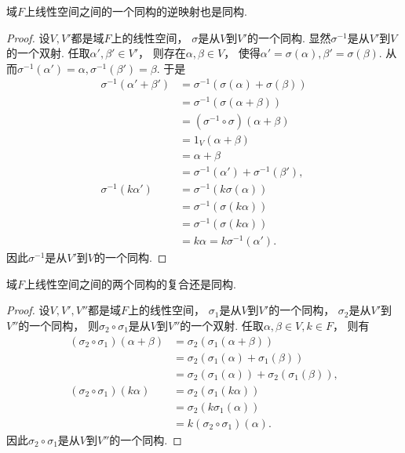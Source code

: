 \begin{proposition}
域\(F\)上线性空间之间的一个同构的逆映射也是同构.
\begin{proof}
设\(V,V'\)都是域\(F\)上的线性空间，
\(\sigma\)是从\(V\)到\(V'\)的一个同构.
显然\(\sigma^{-1}\)是从\(V'\)到\(V\)的一个双射.
任取\(\alpha',\beta' \in V'\)，
则存在\(\alpha,\beta \in V\)，
使得\(\alpha' = \sigma(\alpha),
\beta' = \sigma(\beta)\).
从而\(\sigma^{-1}(\alpha') = \alpha,
\sigma^{-1}(\beta') = \beta\).
于是\begin{align*}
	\sigma^{-1}(\alpha' + \beta')
	&= \sigma^{-1}(\sigma(\alpha) + \sigma(\beta)) \\
	&= \sigma^{-1}(\sigma(\alpha + \beta)) \\
	&= (\sigma^{-1} \circ \sigma)(\alpha + \beta) \\
	&= 1_V (\alpha + \beta) \\
	&= \alpha + \beta \\
	&= \sigma^{-1}(\alpha') + \sigma^{-1}(\beta'), \\
	\sigma^{-1}(k \alpha')
	&= \sigma^{-1}(k \sigma(\alpha)) \\
	&= \sigma^{-1}(\sigma(k \alpha)) \\
	&= \sigma^{-1}(\sigma(k \alpha)) \\
	&= k \alpha
	= k \sigma^{-1}(\alpha').
\end{align*}
因此\(\sigma^{-1}\)是从\(V'\)到\(V\)的一个同构.
\end{proof}
\end{proposition}

\begin{proposition}
域\(F\)上线性空间之间的两个同构的复合还是同构.
\begin{proof}
设\(V,V',V''\)都是域\(F\)上的线性空间，
\(\sigma_1\)是从\(V\)到\(V'\)的一个同构，
\(\sigma_2\)是从\(V'\)到\(V''\)的一个同构，
则\(\sigma_2 \circ \sigma_1\)是从\(V\)到\(V''\)的一个双射.
任取\(\alpha,\beta \in V,
k \in F\)，
则有\begin{align*}
	(\sigma_2 \circ \sigma_1)(\alpha + \beta)
	&= \sigma_2(\sigma_1(\alpha + \beta)) \\
	&= \sigma_2(\sigma_1(\alpha) + \sigma_1(\beta)) \\
	&= \sigma_2(\sigma_1(\alpha)) + \sigma_2(\sigma_1(\beta)), \\
	(\sigma_2 \circ \sigma_1)(k \alpha)
	&= \sigma_2(\sigma_1(k \alpha)) \\
	&= \sigma_2(k \sigma_1(\alpha)) \\
	&= k (\sigma_2 \circ \sigma_1)(\alpha).
\end{align*}
因此\(\sigma_2 \circ \sigma_1\)是从\(V\)到\(V''\)的一个同构.
\end{proof}
\end{proposition}
